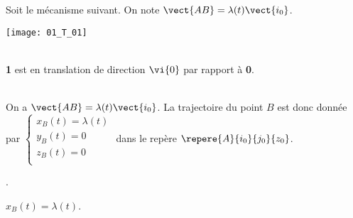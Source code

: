 \normaltrue
\correctiontrue


\setcounter{numques}{0}


\ifcorrection
\else
{}
\fi

\ifprof
\else
Soit le mécanisme suivant. On note $\vect{AB}=\lambda(t)\vect{i_0}$.
\begin{marginfigure}
\begin{center}
\texttt{[image: 01\_T\_01]}
\end{center}
\end{marginfigure}
\fi

\ifprof~\\
\textbf{1} est en translation de direction $\vi{0}$ par rapport à \textbf{0}.
\else
\fi

\ifprof~\\
On a $\vect{AB}=\lambda(t)\vect{i_0} $. La trajectoire du point $B$ est donc donnée par 
$\left\{ 
\begin{array}{l}
x_B(t) = \lambda (t) \\
y_B(t) = 0 \\
z_B(t) = 0 \\
\end{array}
\right.$ dans le repère $\repere{A}{i_0}{j_0}{z_0}$.
\else
\fi


\ifprof
\else
\begin{marginnote}
\begin{defi}
\item .
\item $x_B(t) = \lambda (t)$.
 \end{defi}
\end{marginnote}
 
\fi


